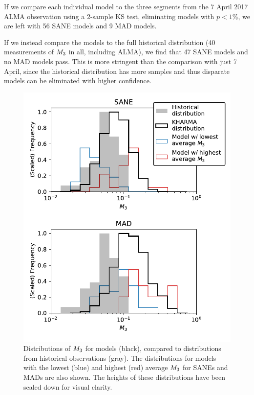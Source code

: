 If we compare each individual model to the three segments from the 7 April 2017 ALMA observation using a 2-sample KS test, eliminating models with $p < 1\%$, we are left with 56 SANE models and 9 MAD models.

If we instead compare the models to the full historical distribution (40 measurements of $M_{3}$ in all, including ALMA), we find that 47 SANE models and no MAD models pass. This is more stringent than the comparison with just 7 April, since the historical distribution has more samples and thus disparate models can be eliminated with higher confidence.

\begin{figure}
  \centering
  \includegraphics[width=\columnwidth]{./figures/mi_hist.pdf}
  \caption{Distributions of $M_{3}$ for \kharma models (black), compared to distributions from historical observations (gray). The distributions for models with the lowest (blue) and highest (red) average $M_{3}$ for SANEs and MADs are also shown. The heights of these distributions have been scaled down for visual clarity.
  }
  \label{fig:cmp_ALMA_var}
\end{figure}

